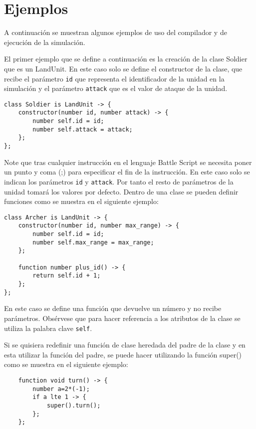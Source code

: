 \section{Ejemplos}

A continuación se muestran algunos ejemplos de uso del compilador y de ejecución de la simulación.

El primer ejemplo que se define a continuación es la creación de la clase Soldier que es un LandUnit. En este caso solo se define el constructor de la clase, que recibe el parámetro \verb|id| que representa el identificador de la unidad en la simulación y el par\'ametro \verb|attack| que es el valor de ataque de la unidad.

\begin{verbatim}
class Soldier is LandUnit -> {  
    constructor(number id, number attack) -> {
        number self.id = id;
        number self.attack = attack;
    };
}; 
\end{verbatim}

Note que tras cualquier instrucción en el lenguaje Battle Script se necesita poner un punto y coma (;) para especificar el fin de la instrucción. En este caso solo se indican los par\'ametros \verb|id| y \verb|attack|. Por tanto el resto de par\'ametros de la unidad tomar\'a los valores por defecto. Dentro de una clase se pueden definir funciones como se muestra en el siguiente ejemplo:

\begin{verbatim}
class Archer is LandUnit -> {
    constructor(number id, number max_range) -> {
        number self.id = id;
        number self.max_range = max_range;
    };
		
    function number plus_id() -> {
        return self.id + 1;
    };
};
\end{verbatim}

En este caso se define una funci\'on que devuelve un n\'umero y no recibe par\'ametros. Obs\'ervese que para hacer referencia a los atributos de la clase se utiliza la palabra clave \verb|self|.

Si se quisiera redefinir una funci\'on  de clase heredada del padre de la clase y en esta utilizar la funci\'on del padre, se puede hacer utilizando la funci\'on super() como se muestra en el siguiente ejemplo:

\begin{verbatim}
    function void turn() -> {
        number a=2*(-1);
        if a lte 1 -> {
            super().turn();
        };
    };
\end{verbatim}


